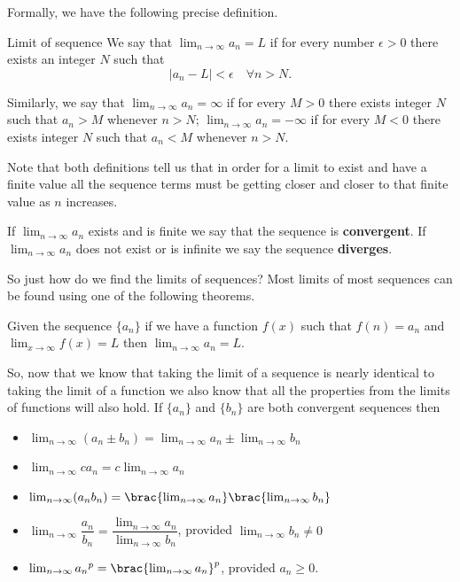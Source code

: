 Formally, we have the following precise definition.
\begin{defn}{Limit of sequence}{}
We say that $\lim_{n\to\infty}a_n=L$ if for every number $\epsilon>0$ there exists an integer $N$ such that
\[ |a_n-L|<\epsilon \quad \forall n>N. \]

Similarly, we say that $\lim_{n\to\infty}a_n=\infty$ if for every $M>0$ there exists integer $N$ such that $a_n>M$ whenever $n>N$; $\lim_{n\to\infty}a_n=-\infty$ if for every $M<0$ there exists integer $N$ such that $a_n<M$ whenever $n>N$.
\end{defn}

Note that both definitions tell us that in order for a limit to exist and have a finite value all the sequence terms must be getting closer and closer to that finite value as $n$ increases.

If $\lim_{n\to\infty}a_n$ exists and is finite we say that the sequence is \textbf{convergent}. If $\lim_{n\to\infty}a_n$ does not exist or is infinite we say the sequence \textbf{diverges}.

So just how do we find the limits of sequences? Most limits of most sequences can be found using one of the following theorems.

\begin{thrm}{}{}
Given the sequence $\{a_n\}$ if we have a function $f(x)$ such that $f(n)=a_n$ and $\lim_{x\to\infty}f(x)=L$ then $\lim_{n\to\infty}a_n=L$.
\end{thrm}

So, now that we know that taking the limit of a sequence is nearly identical to taking the limit of a function we also know that all the properties from the limits of functions will also hold. If $\{a_n\}$ and $\{b_n\}$ are both convergent sequences then
\begin{itemize}
\item $\lim_{n\to\infty}(a_n\pm b_n)=\lim_{n\to\infty}a_n\pm\lim_{n\to\infty}b_n$
\item $\lim_{n\to\infty}ca_n=c\lim_{n\to\infty}a_n$
\item $\lim_{n\to\infty}(a_nb_n)=\brac{\lim_{n\to\infty}a_n}\brac{\lim_{n\to\infty}b_n}$
\item $\lim_{n\to\infty}\dfrac{a_n}{b_n}=\dfrac{\lim_{n\to\infty}a_n}{\lim_{n\to\infty}b_n}$, provided $\lim_{n\to\infty}b_n\neq0$
\item $\lim_{n\to\infty}{a_n}^p=\brac{\lim_{n\to\infty}a_n}^p$, provided $a_n\ge0$.
\end{itemize}

